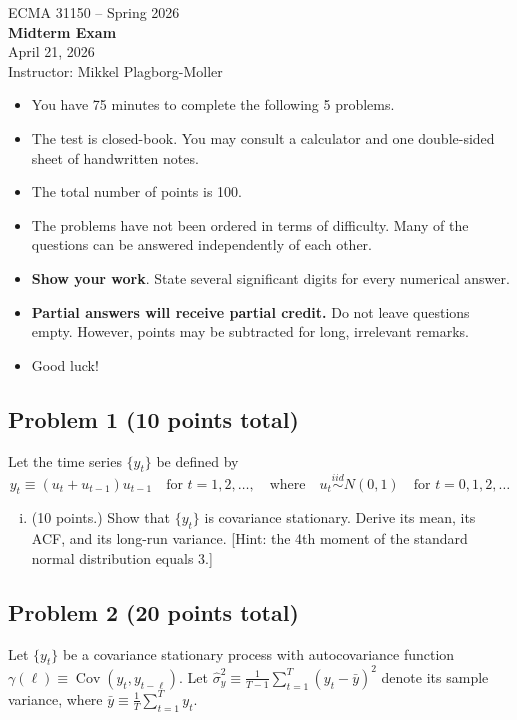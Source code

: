\documentclass[12pt]{article}
\DeclareMathOperator*{\cov}{Cov}
\begin{document}
\begin{center}
{\large ECMA 31150 -- Spring 2026} \\[0.5\baselineskip]
{\Large \bf Midterm Exam} \\[0.3\baselineskip]
April 21, 2026 \\[0.3\baselineskip]
Instructor: Mikkel Plagborg-Moller
\end{center}

\bigskip

\begin{itemize}
\item You have 75 minutes to complete the following 5 problems.
\item The test is closed-book. You may consult a calculator and one double-sided sheet of handwritten notes.
\item The total number of points is 100.
\item The problems have not been ordered in terms of difficulty. Many of the questions can be answered independently of each other.
\item \textbf{Show your work}. State several significant digits for every numerical answer.
\item \textbf{Partial answers will receive partial credit.} Do not leave questions empty. However, points may be subtracted for long, irrelevant remarks.
\item Good luck!
\end{itemize}

\clearpage

\subsection*{Problem 1 (10 points total)}
Let the time series $\lbrace y_t \rbrace$ be defined by
\[y_t \equiv (u_t + u_{t-1})u_{t-1} \quad \text{for } t=1,2,\dots,\quad \text{where} \quad u_t \overset{iid}{\sim} N(0,1) \quad \text{for } t=0,1,2,\dots\]
\begin{enumerate}[i)]
\item (10 points.) Show that $\lbrace y_t \rbrace$ is covariance stationary. Derive its mean, its ACF, and its long-run variance. [Hint: the 4th moment of the standard normal distribution equals 3.]
\end{enumerate}

\subsection*{Problem 2 (20 points total)}
Let $\lbrace y_t \rbrace$ be a covariance stationary process with autocovariance function $\gamma(\ell)\equiv \cov(y_t,y_{t-\ell})$. Let $\hat{\sigma}_y^2 \equiv \frac{1}{T-1}\sum_{t=1}^T (y_t-\bar{y})^2$ denote its sample variance, where $\bar{y} \equiv \frac{1}{T}\sum_{t=1}^T y_t$.
\end{document}
